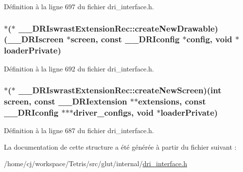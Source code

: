 Définition à la ligne 697 du fichier dri\-\_\-interface.\-h.

\hypertarget{struct_____d_r_iswrast_extension_rec_a0cb888f1b3abf57975a8b5f417a3a7fc}{
\subsubsection[{create\-New\-Drawable}]{$\ast$($\ast$ \-\_\-\-\_\-\-D\-R\-Iswrast\-Extension\-Rec\-::create\-New\-Drawable)({\bf \-\_\-\-\_\-\-D\-R\-Iscreen} $\ast$screen, const {\bf \-\_\-\-\_\-\-D\-R\-Iconfig} $\ast$config, {\bf void} $\ast$loader\-Private)}}\label{struct_____d_r_iswrast_extension_rec_a0cb888f1b3abf57975a8b5f417a3a7fc}


Définition à la ligne 692 du fichier dri\-\_\-interface.\-h.

\hypertarget{struct_____d_r_iswrast_extension_rec_a3c32551d1ae7d0b952dbc54e6938617b}{
\subsubsection[{create\-New\-Screen}]{$\ast$($\ast$ \-\_\-\-\_\-\-D\-R\-Iswrast\-Extension\-Rec\-::create\-New\-Screen)(int screen, const {\bf \-\_\-\-\_\-\-D\-R\-Iextension} $\ast$$\ast$extensions, const {\bf \-\_\-\-\_\-\-D\-R\-Iconfig} $\ast$$\ast$$\ast$driver\-\_\-configs, {\bf void} $\ast$loader\-Private)}}\label{struct_____d_r_iswrast_extension_rec_a3c32551d1ae7d0b952dbc54e6938617b}


Définition à la ligne 687 du fichier dri\-\_\-interface.\-h.



La documentation de cette structure a été générée à partir du fichier suivant \-:\begin{DoxyCompactItemize}
\item 
/home/cj/workspace/\-Tetris/src/glut/internal/\hyperlink{dri__interface_8h}{dri\-\_\-interface.\-h}\end{DoxyCompactItemize}
